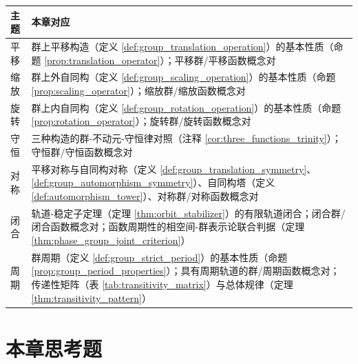 \begingroup
\renewcommand{\arraystretch}{1.3}
\begin{longtable}{>{\centering\arraybackslash}p{2.2cm}>{\raggedright\arraybackslash}p{10.5cm}}
\toprule
主题 & 本章对应 \\
\midrule
平移 & 群上平移构造（定义 \ref{def:group_translation_operation}）的基本性质（命题 \ref{prop:translation_operator}）；平移群/平移函数概念对 \\
缩放 & 群上外自同构（定义 \ref{def:group_scaling_operation}）的基本性质（命题 \ref{prop:scaling_operator}）；缩放群/缩放函数概念对 \\
旋转 & 群上内自同构（定义 \ref{def:group_rotation_operation}）的基本性质（命题 \ref{prop:rotation_operator}）；旋转群/旋转函数概念对 \\
守恒 & 三种构造的群-不动元-守恒律对照（注释 \ref{cor:three_functions_trinity}）；守恒群/守恒函数概念对 \\
对称 & 平移对称与自同构对称（定义 \ref{def:group_translation_symmetry}、\ref{def:group_automorphism_symmetry}）、自同构塔（定义 \ref{def:automorphism_tower}）、对称群/对称函数概念对 \\
闭合 & 轨道-稳定子定理（定理 \ref{thm:orbit_stabilizer}）的有限轨道闭合；闭合群/闭合函数概念对；函数周期性的相空间-群表示论联合判据（定理 \ref{thm:phase_group_joint_criterion}） \\
周期 & 群周期（定义 \ref{def:group_strict_period}）的基本性质（命题 \ref{prop:group_period_properties}）；具有周期轨道的群/周期函数概念对；传递性矩阵（表 \ref{tab:transitivity_matrix}）与总体规律（定理 \ref{thm:transitivity_pattern}） \\
\bottomrule
\end{longtable}
\endgroup

\section*{本章思考题}

